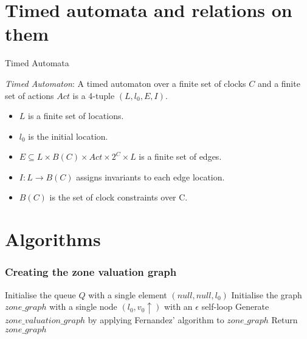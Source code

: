 \documentclass{beamer}
\begin{document}
\section{Timed automata and relations on them}

\begin{frame}{Timed Automata}
  \begin{definition}
    \emph{Timed Automaton}: A timed automaton
    \cite{Alur94atheory} over a finite set of clocks $C$
    and a finite set of actions $Act$ is a 4-tuple $(L, l_{0}, E, I)$.
    \begin{itemize}
    \item $L$ is a finite set of locations.
    \item $l_{0}$ is the initial location.
    \item $E \subseteq L \times B(C) \times Act \times 2^{C} \times L$
      is a finite set of edges.
    \item $I: L \rightarrow B(C)$ assigns invariants to each edge
      location.
    \item $B(C)$ is the set of clock constraints over C.
    \end{itemize}
  \end{definition}
\end{frame}

\section{Algorithms}

\begin{frame}[fragile]
  \frametitle{Creating the zone valuation graph}

  \begin{algorithm2e}[H]
    Initialise the queue $Q$ with a single element $(null, null, l_0)$\;
    Initialise the graph $zone\_graph$ with a single node $(l_0, v_0 \uparrow)$
    with an $\epsilon$ self-loop\;
    Generate $zone\_valuation\_graph$ by applying Fernandez' algorithm to $zone\_graph$\;
    Return $zone\_graph$\;
  \end{algorithm2e}

\end{frame}
\end{document}
